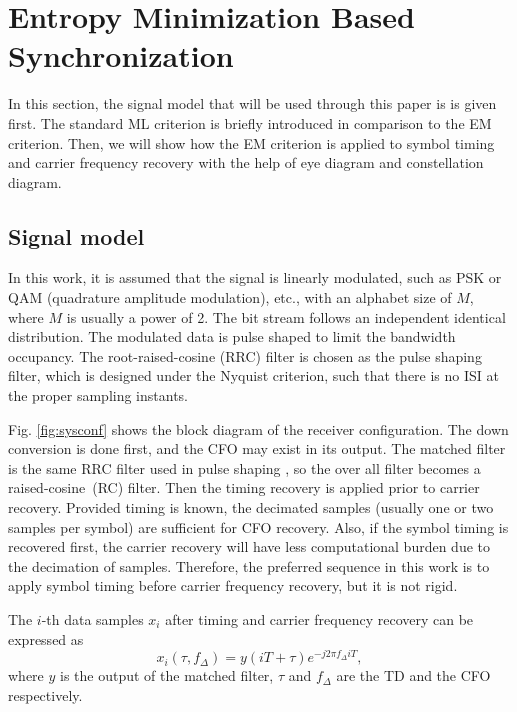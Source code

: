 \documentclass[journal,comsoc]{IEEEtran}
\begin{document}
\section{Entropy Minimization Based Synchronization}
\label{sec:entropy}
In this section, the signal model that will be used through this paper is is given first.
The standard ML criterion is briefly introduced in comparison to the EM criterion.
Then, we will show  how the EM criterion is applied to symbol timing and carrier frequency recovery with the help of eye diagram and constellation diagram.
\subsection{Signal model }  


In this work, it is assumed that the signal is linearly modulated, such as PSK or QAM (quadrature amplitude modulation), etc., with an alphabet size of \(M\), where \(M\) is usually a power of 2.
The bit stream follows an independent identical distribution.
The modulated data is pulse shaped to limit the bandwidth occupancy.
The root-raised-cosine (RRC) filter is chosen as the pulse shaping filter, which is designed under the Nyquist criterion, 
such that there is no ISI at the proper sampling instants.



Fig. \ref{fig:sysconf} shows the block diagram of the receiver configuration.
The down conversion is done first, and the CFO may exist in its output.
The matched filter is the same RRC filter used in pulse shaping , so the over all filter becomes a raised-cosine~(RC) filter. 
Then the timing recovery is applied prior to carrier recovery.
Provided timing is known, the decimated samples (usually one or two samples per symbol) are sufficient for CFO recovery.
Also, if the symbol timing is recovered first, the carrier recovery will have less computational burden due to the decimation of samples.
Therefore, the preferred sequence in this work is to apply symbol timing before carrier frequency recovery, but it is not rigid.

The $i$-th data samples \(x_i\) after timing and carrier frequency recovery can be expressed as
\begin{equation}
{x_i}( \tau ,{f_\Delta }) = y(iT +  \tau ){e^{ - j2\pi {f_\Delta }iT}},
\end{equation}
where \(y\) is the output of the matched filter, \(\tau\) and \(f_\Delta\) are the TD and the CFO respectively.
\end{document}
